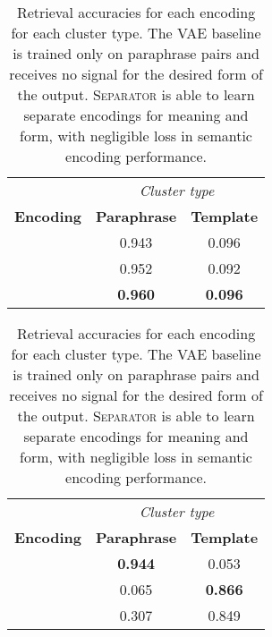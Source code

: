 \documentclass[11pt,a4paper]{article}
\begin{document}
\begin{table}[t!]
\begin{subtable}[]{0.49\textwidth}
        \centering
        \begin{tabular}{c||cc}
        & \multicolumn{2}{c}{\textit{Cluster type}} \\
       \textbf{Encoding} & \textbf{Paraphrase} & \textbf{Template} \\
        \hhline{=#==}
         & \cellcolor{OrangeRed!94}\color{white}0.943 & \cellcolor{OrangeRed!9}0.096 \\
         & \cellcolor{OrangeRed!95}\color{white}0.952 & \cellcolor{OrangeRed!9}0.092 \\
        \hline
         & \cellcolor{OrangeRed!96}\color{white}\textbf{0.960} & \cellcolor{OrangeRed!9}\textbf{0.096} \\
        \end{tabular}
        \caption{VAE Baseline}
        \label{tab:separation_baseline}
    \end{subtable}
    
\vspace{.1cm}
  \hfill
    \begin{subtable}[]{0.49\textwidth}
    
        \centering
        \begin{tabular}{c||cc}
        & \multicolumn{2}{c}{\textit{Cluster type}} \\
       \textbf{Encoding} & \textbf{Paraphrase} & \textbf{Template} \\
        \hhline{=#==}
         & \cellcolor{OrangeRed!94}\color{white}\textbf{0.944} & \cellcolor{OrangeRed!5}0.053 \\
         & \cellcolor{OrangeRed!6}0.065 & \cellcolor{OrangeRed!86}\color{white}\textbf{0.866} \\
        \hline
         & \cellcolor{OrangeRed!31}0.307 & \cellcolor{OrangeRed!85}\color{white}0.849 \\
        \end{tabular}
        \caption{\textsc{Separator}}
        \label{tab:separation_ours}
    \end{subtable}
\caption{Retrieval accuracies for each encoding for each cluster type. The VAE baseline is trained only on paraphrase pairs and receives no signal for the desired form of the output. \textsc{Separator} is able to learn separate encodings for meaning and form, with negligible loss in semantic encoding performance.}
    \label{tab:separation}
\end{table}
\end{document}
